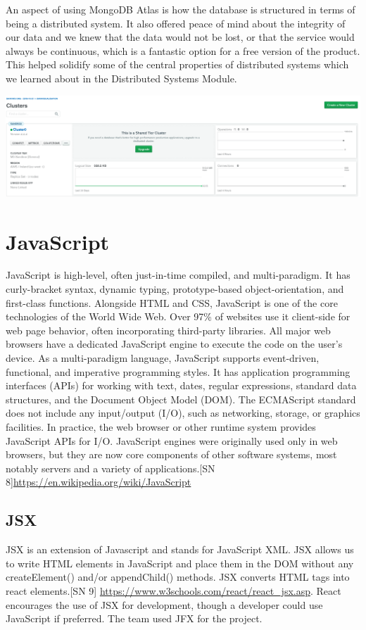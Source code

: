 An aspect of using MongoDB Atlas is how the database is structured in terms of being a distributed system. It also offered peace of mind about the integrity of our data and we knew that the data would not be lost, or that the service would always be continuous, which is a fantastic option for a free version of the product. 
This helped solidify  some of the central properties of distributed systems which we learned about in the Distributed Systems Module.
\begin{center}    
      \includegraphics[scale=0.5]{img/clusterDB.PNG}
\end{center}

\section{JavaScript}
JavaScript is high-level, often just-in-time compiled, and multi-paradigm. It has curly-bracket syntax, dynamic typing, prototype-based object-orientation, and first-class functions. 
Alongside HTML and CSS, JavaScript is one of the core technologies of the World Wide Web. Over 97\% of websites use it client-side for web page behavior, often incorporating third-party libraries. All major web browsers have a dedicated JavaScript engine to execute the code on the user's device. 
As a multi-paradigm language, JavaScript supports event-driven, functional, and imperative programming styles. It has application programming interfaces (APIs) for working with text, dates, regular expressions, standard data structures, and the Document Object Model (DOM).
The ECMAScript standard does not include any input/output (I/O), such as networking, storage, or graphics facilities. In practice, the web browser or other runtime system provides JavaScript APIs for I/O.
JavaScript engines were originally used only in web browsers, but they are now core components of other software systems, most notably servers and a variety of applications.[SN 8]\url{https://en.wikipedia.org/wiki/JavaScript}
\subsection{JSX}
JSX is an extension of Javascript and stands for JavaScript XML.
JSX allows us to write HTML elements in JavaScript and place them in the DOM without any createElement()  and/or appendChild() methods. JSX converts HTML tags into react elements.[SN 9] \url{https://www.w3schools.com/react/react_jsx.asp}.
React encourages the use of JSX for development, though a developer could use JavaScript if preferred.
The team used JFX for the project.

